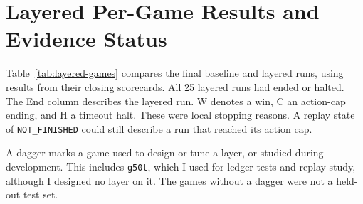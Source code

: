 \section{Layered Per-Game Results and Evidence Status}\label{app:layered}
Table~\ref{tab:layered-games} compares the final baseline and layered runs, using results from their closing scorecards. All 25 layered runs had ended or halted. The End column describes the layered run. W denotes a win, C an action-cap ending, and H a timeout halt. These were local stopping reasons. A replay state of \texttt{NOT\_FINISHED} could still describe a run that reached its action cap.

A dagger marks a game used to design or tune a layer, or studied during development. This includes \texttt{g50t}, which I used for ledger tests and replay study, although I designed no layer on it. The games without a dagger were not a held-out test set.
